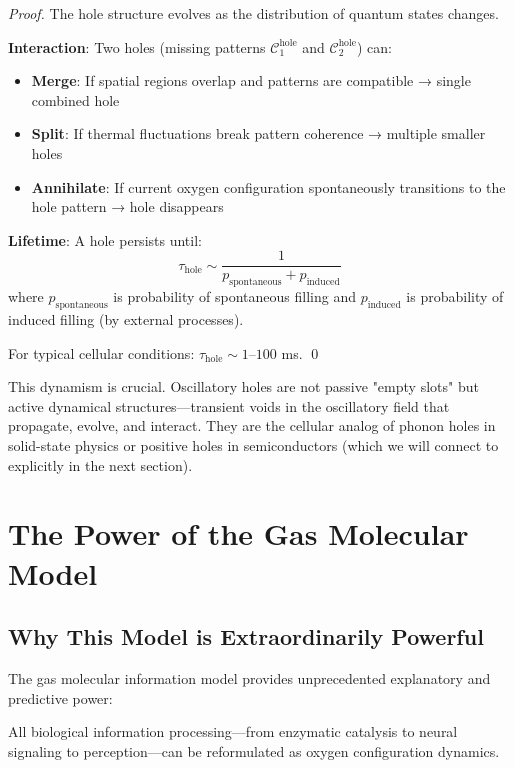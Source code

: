 \begin{proof}
The hole structure evolves as the distribution of quantum states changes.

\textbf{Interaction}: Two holes (missing patterns $\mathcal{C}_1^{\text{hole}}$ and $\mathcal{C}_2^{\text{hole}}$) can:
\begin{itemize}
\item \textbf{Merge}: If spatial regions overlap and patterns are compatible → single combined hole
\item \textbf{Split}: If thermal fluctuations break pattern coherence → multiple smaller holes
\item \textbf{Annihilate}: If current oxygen configuration spontaneously transitions to the hole pattern → hole disappears
\end{itemize}

\textbf{Lifetime}: A hole persists until:
\begin{equation}
\tau_{\text{hole}} \sim \frac{1}{p_{\text{spontaneous}} + p_{\text{induced}}}
\end{equation}
where $p_{\text{spontaneous}}$ is probability of spontaneous filling and $p_{\text{induced}}$ is probability of induced filling (by external processes).

For typical cellular conditions: $\tau_{\text{hole}} \sim 1$--$100$ ms. \qed
\end{proof}

\begin{remark}
This dynamism is crucial. Oscillatory holes are not passive "empty slots" but active dynamical structures—transient voids in the oscillatory field that propagate, evolve, and interact. They are the cellular analog of phonon holes in solid-state physics or positive holes in semiconductors (which we will connect to explicitly in the next section).
\end{remark}

\section{The Power of the Gas Molecular Model}

\subsection{Why This Model is Extraordinarily Powerful}

The gas molecular information model provides unprecedented explanatory and predictive power:

\begin{theorem}
\label{thm:oxygen_universality}
All biological information processing—from enzymatic catalysis to neural signaling to perception—can be reformulated as oxygen configuration dynamics.
\end{theorem}

